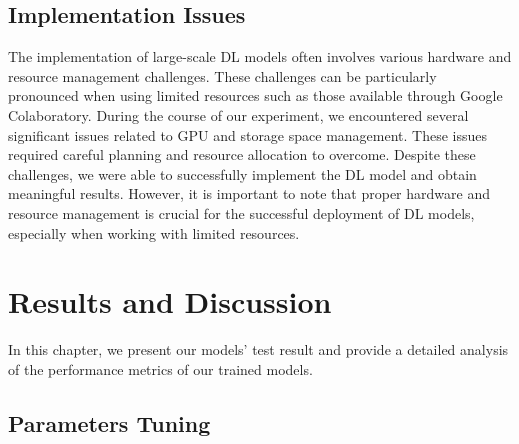 \documentclass[12pt]{diazessay}
\begin{document}
    \subsection{Implementation Issues}
    \-\hspace{0.7cm} The implementation of large-scale DL models often involves various hardware and resource management challenges. These challenges can be particularly pronounced when using limited resources such as those available through Google Colaboratory. During the course of our experiment, we encountered several significant issues related to GPU and storage space management. These issues required careful planning and resource allocation to overcome. Despite these challenges, we were able to successfully implement the DL model and obtain meaningful results. However, it is important to note that proper hardware and resource management is crucial for the successful deployment of DL models, especially when working with limited resources.

    \newpage
    \section{Results and Discussion}
    \-\hspace{0.7cm} In this chapter, we present our models' test result and provide a detailed analysis of the performance metrics of our trained models.
    
    \subsection{Parameters Tuning} 

\end{document}
